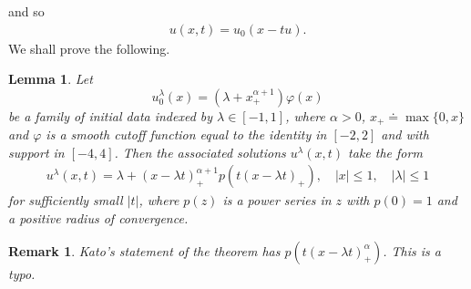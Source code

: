 \documentclass[12pt,reqno]{amsart}
\numberwithin{equation}{section}  %
\numberwithin{figure}{section}
\newcommand{\vp}{\varphi}
\newtheorem{lemma}[theorem]{Lemma}
\newtheorem{remark}[theorem]{Remark}
\begin{document}
%
%
and so
%
%
%
%
\begin{equation*}
\begin{split}
u(x,t) = u_{0}(x - tu).
\end{split}
\end{equation*}
%
%
We shall prove the following.
%
%
%
%
%
%
%
%
\begin{lemma}
%
Let 
\begin{equation}
  \label{key-init-data}
  u_{0}^{\lambda}(x) = (\lambda +
x_{+}^{\alpha + 1}) \vp(x)
\end{equation}
be a family of initial data indexed by $\lambda \in
[-1, 1]$, where $\alpha > 0$, $x_{+} \doteq \max\{0, x\}$ and $\vp$ is a smooth cutoff
function equal to the identity in $[-2, 2]$ and with support in $[-4,4]$. Then the associated solutions $u^{\lambda}(x,t)$ take the form
\begin{equation}
    \label{u-lam-explicit-form}
    \begin{split}
        u^{\lambda}(x,t) = \lambda + (x - \lambda
        t)^{\alpha + 1}_{+} p(t(x- \lambda
        t)_{+}), \quad | x | \le 1, \quad
        | \lambda | \le 1
    \end{split}
\end{equation}
%
%
for sufficiently small $| t |$, where $p(z)$ is a power series in $z$ with $p(0) =1$ and a positive radius of convergence.
\label{lem:sol-burg}
\end{lemma}
%
%
\begin{framed}
%
%
\begin{remark}
Kato's statement of the theorem has $p(t(x - \lambda t)^{\alpha}_{+})$. This is a typo.
\label{rem:kato-typo}
\end{remark}
%
%
\end{framed}
%
%
\end{document}
